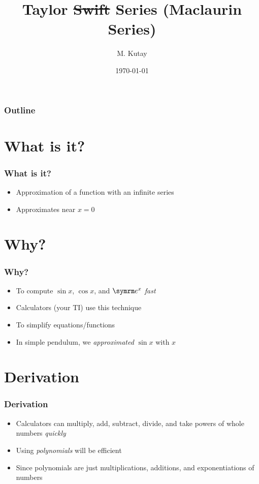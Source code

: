 \documentclass{beamer}
\title{Taylor \sout{Swift} Series (Maclaurin Series)}
\author{M. Kutay}
\institute{Made with LaTeX}
\date{\today}
\begin{document}
\begin{frame}
  \titlepage
\end{frame}

\begin{frame}
  \frametitle{Outline}
  \tableofcontents
\end{frame}

\section{What is it?}

\begin{frame}
  \frametitle{What is it?}
  \begin{itemize}
    \item Approximation of a function with an infinite series
    \item Approximates near \( x = 0 \)
  \end{itemize}
\end{frame}

\section{Why?}

\begin{frame}
  \frametitle{Why?}
  \begin{itemize}
    \item To compute \( \sin x \), \( \cos x \), and \( \e^x \) \textit{fast}
    \item Calculators (your TI) use this technique
    \item To simplify equations/functions
    \item In simple pendulum, we \textit{approximated} \( \sin x \) with \( x \)
  \end{itemize}
\end{frame}

\section{Derivation}

\begin{frame}
  \frametitle{Derivation}
  \begin{itemize}
    \item Calculators can multiply, add, subtract, divide, and take powers of whole numbers \textit{quickly}
    \item Using \textit{polynomials} will be efficient
    \item Since polynomials are just multiplications, additions, and exponentiations of numbers
  \end{itemize}
\end{frame}
\end{document}
